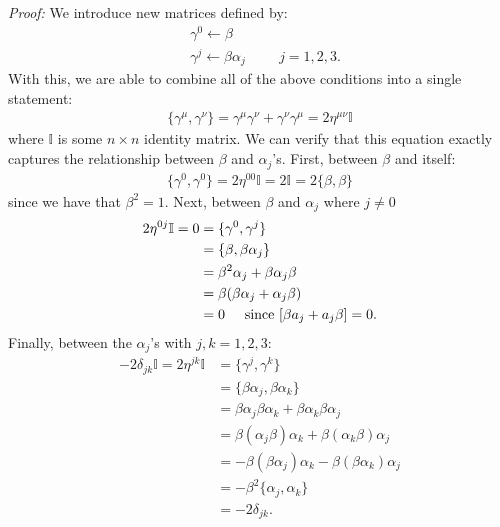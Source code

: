\documentclass{book}
\theoremstyle{definition}
\newcommand{\nn}{\nonumber}
\newcommand{\al}{\alpha}
\newcommand{\be}{\beta}
\begin{document}
\textit{Proof:} We introduce new matrices defined by:
\begin{align}
&\gamma^0 \leftarrow \beta\\
&\gamma^j \leftarrow \beta\alpha_j\hspace{1cm} j =1,2,3.
\end{align}
With this, we are able to combine all of the above conditions into a single statement:
\begin{align}
\boxed{\{\gamma^\mu, \gamma^\nu\} = \gamma^\mu \gamma^\nu + \gamma^\nu\gamma^\mu = 2\eta^{\mu\nu}\mathbb{I}}
\end{align} 
where $\mathbb{I}$ is some $n\times n$ identity matrix. We can verify that this equation exactly captures the relationship between $\beta$ and $\alpha_j$'s. First, between $\beta$ and itself:
\begin{align}
\{\gamma^0 , \gamma^0\} = 2\eta^{00}\mathbb{I} = 2\mathbb{I} \nonumber = 2\{\beta,\beta\} 
\end{align}
since we have that $\beta^2 = 1$. Next, between $\beta$ and $\alpha_j$ where $j\neq 0$
\begin{align}
2\eta^{0j}\mathbb{I} = 0
&=  \{ \gamma^0,\gamma^j \} \nonumber\\
&= \{\beta, \beta \alpha_j\} \nonumber\\
&= \beta^2 \alpha_j + \beta \alpha_j \beta \nonumber\\
&= \beta( \beta\alpha_j +  \alpha_j \beta) \nonumber \nonumber\\
&= 0 \hspace{0.5cm}\text{since } [\beta a_j + a_j \beta] = 0 .
\end{align} 
Finally, between the $\alpha_j$'s with $j,k = 1,2,3$:
\begin{align}
-2\delta_{jk}\mathbb{I} 
= 2\eta^{jk}\mathbb{I}
&= \{ \gamma^j, \gamma^k \}  \nn\\
&= \{ \beta \al_j, \beta \al_k \} \nn\\
&= \be \al_j \be \al_k + \be \al_k \be \al_j \nn\\
&= \be (\al_j \be) \al_k + \be (\al_k \be) \al_j \nn\\
&= -\be (\be \al_j ) \al_k - \be (\be \al_k ) \al_j \nn\\
&= -\beta^2 \{ \al_j, \al_k \}\nn\\
&= -2\delta_{jk}.
\end{align}
\end{document}
